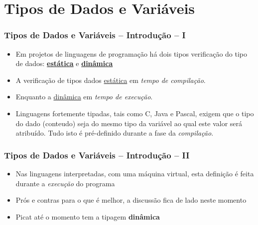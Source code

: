 \section{Tipos de Dados e Variáveis}

\begin{frame}[fragile]
 \frametitle{Tipos de Dados e Variáveis -- Introdução -- I}


\begin{itemize}

\item Em projetos de linguagens de programação há dois tipos 
verificação do tipo de dados: \underline{\textbf{estática}} e \underline{\textbf{dinâmica}}

  
  \pause 
  \item A verificação de tipos dados   \underline{estática} 
   em \textit{tempo de compilação}.
  
    \pause 
  \item Enquanto a \underline{dinâmica} em \textit{tempo de execução}.
  
  \pause 
  \item Linguagens fortemente tipadas, tais como C, Java e Pascal, 
  exigem que o tipo do dado (conteudo) seja do mesmo tipo da variável 
  ao qual este valor será atribuído. 
  Tudo isto é pré-definido durante a fase da \textit{compilação}.
  
  
\end{itemize}
\end{frame}


\begin{frame}[fragile]
 \frametitle{Tipos de Dados e Variáveis -- Introdução -- II}
\begin{itemize}

  \item Nas linguagens interpretadas, com uma máquina virtual, 
  esta definição é feita durante a \textit{execução} do
  programa
  
  \pause 
  \item Prós e contras para o que é melhor, a discussão fica de lado neste momento
  
  \pause 
  \item Picat até o momento tem a tipagem \textbf{dinâmica}
  
\end{itemize}


\end{frame}



